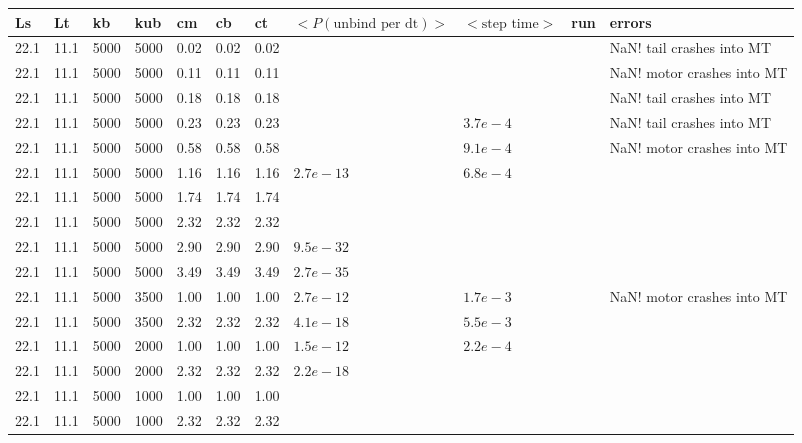 \documentclass[10pt]{article} %
\begin{document}
\begin{center}
  \begin{tabular}{| l | l | l | l | l | l | l | p{3cm} | p{2cm} | l | p{5cm} |}
    \hline
    Ls & Lt & kb & kub & cm & cb & ct & $\Big<P(\mbox{unbind per dt})\Big>$ & $\Big<\mbox{step time}\Big>$ & run & errors\\\hline
    22.1 & 11.1 & 5000 & 5000 & 0.02 & 0.02 & 0.02 & & & & NaN! tail crashes into MT \\\hline
    22.1 & 11.1 & 5000 & 5000 & 0.11 & 0.11 & 0.11 & & & & NaN! motor crashes into MT \\\hline
    22.1 & 11.1 & 5000 & 5000 & 0.18 & 0.18 & 0.18 & & & & NaN! tail crashes into MT \\\hline
    22.1 & 11.1 & 5000 & 5000 & 0.23 & 0.23 & 0.23 & & $3.7e-4$ & & NaN! tail crashes into MT \\\hline
    22.1 & 11.1 & 5000 & 5000 & 0.58 & 0.58 & 0.58 & & $9.1e-4$ & & NaN! motor crashes into MT \\\hline
    22.1 & 11.1 & 5000 & 5000 & 1.16 & 1.16 & 1.16 & $2.7e-13$ & $6.8e-4$ & & \\\hline
    22.1 & 11.1 & 5000 & 5000 & 1.74 & 1.74 & 1.74 & & & & \\\hline
    22.1 & 11.1 & 5000 & 5000 & 2.32 & 2.32 & 2.32 & & & & \\\hline
    22.1 & 11.1 & 5000 & 5000 & 2.90 & 2.90 & 2.90 & $9.5e-32$ & & & \\\hline
    22.1 & 11.1 & 5000 & 5000 & 3.49 & 3.49 & 3.49 & $2.7e-35$ & & & \\\hline
    22.1 & 11.1 & 5000 & 3500 & 1.00 & 1.00 & 1.00 & $2.7e-12$ & $1.7e-3$ & & NaN! motor crashes into MT\\\hline
    22.1 & 11.1 & 5000 & 3500 & 2.32 & 2.32 & 2.32 & $4.1e-18$ & $5.5e-3$ & & \\\hline
    22.1 & 11.1 & 5000 & 2000 & 1.00 & 1.00 & 1.00 & $1.5e-12$ & $2.2e-4$ & & \\\hline
    22.1 & 11.1 & 5000 & 2000 & 2.32 & 2.32 & 2.32 & $2.2e-18$ & & & \\\hline
    22.1 & 11.1 & 5000 & 1000 & 1.00 & 1.00 & 1.00 & & & & \\\hline
    22.1 & 11.1 & 5000 & 1000 & 2.32 & 2.32 & 2.32 & & & & \\\hline

\end{tabular}
\end{center}
\end{document}
